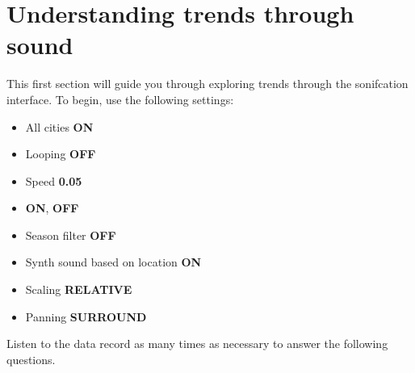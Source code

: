 \documentclass[12pt]{exam}
\begin{document}
\section*{Understanding trends through sound}

\noindent This first section will guide you through exploring  trends through the sonifcation interface. To begin, use the following settings:
\begin{itemize}[noitemsep]
\item All cities \textbf{ON}
\item Looping \textbf{OFF}
\item Speed \textbf{0.05}
\item {} \textbf{ON},  \textbf{OFF}
\item Season filter \textbf{OFF}
\item Synth sound based on location \textbf{ON}
\item Scaling \textbf{RELATIVE}
\item Panning \textbf{SURROUND}
\end{itemize}

\noindent Listen to the data record as many times as necessary to answer the following questions.
\end{document}
